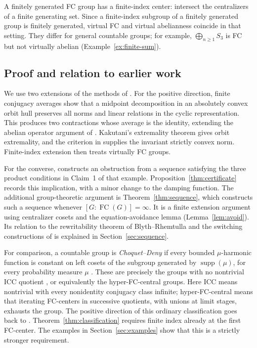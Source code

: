 \documentclass[11pt,letterpaper]{amsart}
\theoremstyle{definition}
\theoremstyle{remark}
\DeclareMathOperator{\FC}{FC}
\DeclareMathOperator{\supp}{supp}
\begin{document}
A finitely generated FC group has a finite-index center: intersect
the centralizers of a finite generating set. Since a finite-index
subgroup of a finitely generated group is finitely generated, virtual
FC and virtual abelianness coincide in that setting. They differ for
general countable groups; for example, $\bigoplus_{n\geq1}S_3$ is FC
but not virtually abelian (Example~\ref{ex:finite-sum}).

\subsection{Proof and relation to earlier work}
We use two extensions of the methods of \cite{DD}.
For the positive direction, finite conjugacy averages show that a
midpoint decomposition in an absolutely convex orbit hull preserves
all norms and linear relations in the cyclic representation. This
produces two contractions whose average is the identity, extending
the abelian operator argument of \cite[Theorem~5.3]{DD}. Kakutani's
extremality theorem gives orbit extremality, and the criterion in
\cite[Theorem~3.1]{DD} supplies the invariant strictly convex norm.
Finite-index extension then treats virtually FC groups.

For the converse, \cite[Example~5.5, Claim~2]{DD} constructs an
obstruction from a sequence satisfying the three product conditions
in Claim~1 of that example. Proposition~\ref{thm:certificate} records
this implication, with a minor change to the damping function.
The additional group-theoretic argument is
Theorem~\ref{thm:sequence}, which constructs such a sequence whenever
$[G:\FC(G)]=\infty$. It is a finite extension argument using
centralizer cosets and the equation-avoidance lemma
(Lemma~\ref{lem:avoid}). Its relation to the rewritability theorem of
Blyth--Rhemtulla \cite{BR} and the switching constructions of
\cite{FTVF,FHTVF,EK} is explained in Section~\ref{sec:sequence}.

For comparison, a countable group is \emph{Choquet--Deny} if every
bounded $\mu$-harmonic function is constant on left cosets of the
subgroup generated by $\supp(\mu)$, for every probability measure
$\mu$ \cite[Definition~2.2]{DD}. These are precisely the groups
with no nontrivial ICC quotient \cite[Theorem~1]{FHTVF}, or
equivalently the hyper-FC-central groups. Here ICC means nontrivial
with every nonidentity conjugacy class infinite; hyper-FC-central
means that iterating FC-centers in successive quotients, with unions
at limit stages, exhausts the group. The positive direction of this
ordinary classification goes back to \cite[Theorems~4.5 and~4.8]{J}.
Theorem~\ref{thm:classification} requires finite index already at the
first FC-center. The examples in Section~\ref{sec:examples} show that
this is a strictly stronger requirement.
\end{document}
